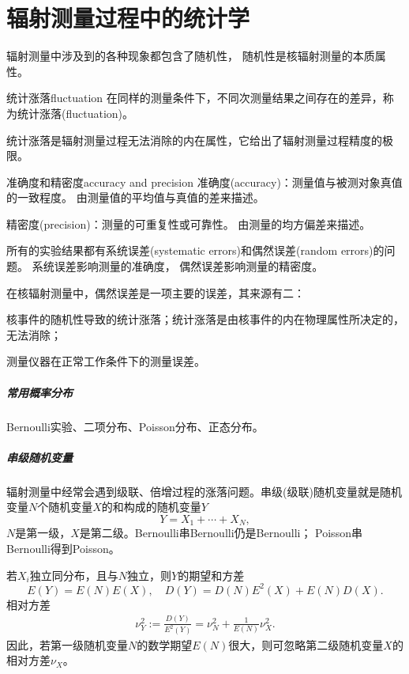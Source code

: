 \chapter{辐射测量过程中的统计学}
辐射测量中涉及到的各种现象都包含了随机性，
随机性是核辐射测量的本质属性。

\begin{definition}{统计涨落}{fluctuation}
	在同样的测量条件下，不同次测量结果之间存在的差异，称为统计涨落(fluctuation)。
\end{definition}
统计涨落是辐射测量过程无法消除的内在属性，它给出了辐射测量过程精度的极限。
\begin{definition}{准确度和精密度}{accuracy and precision}
	准确度(accuracy)：测量值与被测对象真值的一致程度。
	由测量值的平均值与真值的差来描述。

	精密度(precision)：测量的可重复性或可靠性。
	由测量的均方偏差来描述。	
\end{definition}
所有的实验结果都有系统误差(systematic errors)和偶然误差(random errors)的问题。
系统误差影响测量的准确度，
偶然误差影响测量的精密度。

在核辐射测量中，偶然误差是一项主要的误差，其来源有二：
\begin{compactenum}
	\item 核事件的随机性导致的统计涨落；统计涨落是由核事件的内在物理属性所决定的，无法消除；
	\item 测量仪器在正常工作条件下的测量误差。
\end{compactenum}
\paragraph{常用概率分布}
Bernoulli实验、二项分布、Poisson分布、正态分布。
\paragraph{串级随机变量}
辐射测量中经常会遇到级联、倍增过程的涨落问题。串级(级联)随机变量就是随机变量$N$个随机变量$X$的和构成的随机变量$Y$
\[
	Y=X_1+\cdots+X_N,
\]
$N$是第一级，$X$是第二级。Bernoulli串Bernoulli仍是Bernoulli；
Poisson串Bernoulli得到Poisson。

若$X_i$独立同分布，且与$N$独立，则$Y$的期望和方差
\[
	E(Y)=E(N)E(X),\quad D(Y)=D(N)E^2(X)+E(N)D(X).
\]
相对方差
\begin{align}
	\nu_Y^2:=\frac{D(Y)}{E^2(Y)}=\nu_N^2+\frac1{E(N)}\nu_X^2.
\end{align}
因此，若第一级随机变量$N$的数学期望$E(N)$很大，则可忽略第二级随机变量$X$的相对方差$\nu_X$。%

